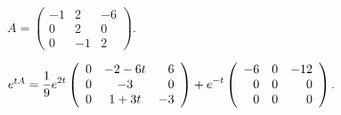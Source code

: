 \documentclass{ximera}
\begin{document}
\begin{computerExercise} \label{c12.1.8d}
$A = \left(\begin{array}{rrr} -1 & 2 & -6\\ 0 & 2 & 0 \\ 0 & -1 & 2
\end{array}\right)$.

\begin{solution}
\ans $e^{tA}= \displaystyle\frac{1}{9}e^{2t}\left(\begin{array}{rcr} 
0 & -2-6t & 6\\ 0 & -3 & 0\\ 0 & 1+3t & -3\end{array}\right) 
+e^{-t}\left(\begin{array}{rrr} -6 & 0 & -12\\  0 & 0 & 0 \\ 0 & 0 & 0 
\end{array}\right)$.



\end{solution}
\end{computerExercise}
\end{document}
